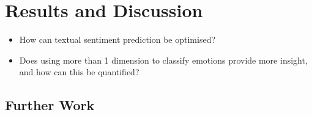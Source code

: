 

 


\section{Results and Discussion}
\begin{itemize}
    \item How can textual sentiment prediction be optimised?
    \item Does using more than 1 dimension to classify emotions provide more insight, and how can this be quantified?
\end{itemize}
\subsection{Further Work}